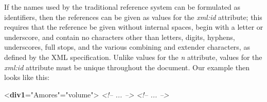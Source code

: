 If the names used by the traditional reference system can be formulated as identifiers, then the references can be given as values for the {\itshape xml:id} attribute; this requires that the reference be given without internal spaces, begin with a letter or underscore, and contain no characters other than letters, digits, hyphens, underscores, full stops, and the various combining and extender characters, as defined by the XML specification. Unlike values for the {\itshape n} attribute, values for the {\itshape xml:id} attribute must be unique throughout the document. Our example then looks like this: \par\bgroup{}\exampleFont \begin{shaded}\noindent\mbox{}{<\textbf{div1}\hspace*{1em}{n}="{Amores}"\hspace*{1em}{type}="{volume}">}\mbox{}\newline 
{}\mbox{}\newline 
\textit{<!-- ... -->}\mbox{}\newline 
{}\mbox{}\newline 
{}\mbox{}\newline 
\hspace*{1em}\mbox{}\newline 
\textit{<!-- ... -->}\mbox{}\newline 
\hspace*{1em}\mbox{}\newline 

\end{shaded}
